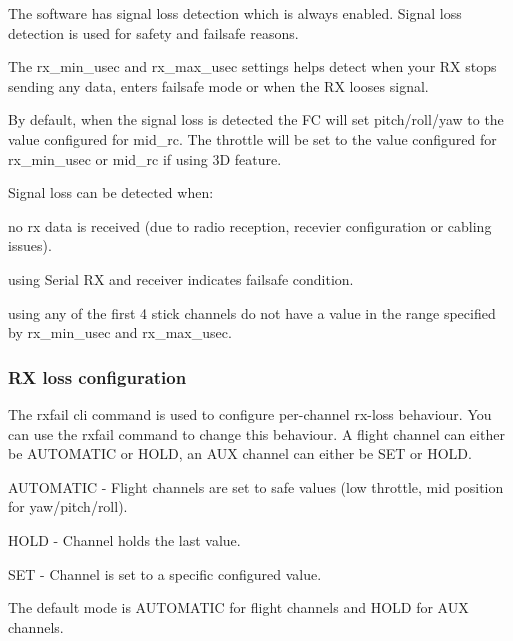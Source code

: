The software has signal loss detection which is always enabled. Signal loss detection is used for safety and failsafe reasons.

The {\ttfamily rx\+\_\+min\+\_\+usec} and {\ttfamily rx\+\_\+max\+\_\+usec} settings helps detect when your R\+X stops sending any data, enters failsafe mode or when the R\+X looses signal.

By default, when the signal loss is detected the F\+C will set pitch/roll/yaw to the value configured for {\ttfamily mid\+\_\+rc}. The throttle will be set to the value configured for {\ttfamily rx\+\_\+min\+\_\+usec} or {\ttfamily mid\+\_\+rc} if using 3\+D feature.

Signal loss can be detected when\+:


\begin{DoxyEnumerate}
\item no rx data is received (due to radio reception, recevier configuration or cabling issues).
\item using Serial R\+X and receiver indicates failsafe condition.
\item using any of the first 4 stick channels do not have a value in the range specified by {\ttfamily rx\+\_\+min\+\_\+usec} and {\ttfamily rx\+\_\+max\+\_\+usec}.
\end{DoxyEnumerate}

\subsubsection*{R\+X loss configuration}

The {\ttfamily rxfail} cli command is used to configure per-\/channel rx-\/loss behaviour. You can use the {\ttfamily rxfail} command to change this behaviour. A flight channel can either be A\+U\+T\+O\+M\+A\+T\+I\+C or H\+O\+L\+D, an A\+U\+X channel can either be S\+E\+T or H\+O\+L\+D.


\begin{DoxyItemize}
\item A\+U\+T\+O\+M\+A\+T\+I\+C -\/ Flight channels are set to safe values (low throttle, mid position for yaw/pitch/roll).
\item H\+O\+L\+D -\/ Channel holds the last value.
\item S\+E\+T -\/ Channel is set to a specific configured value.
\end{DoxyItemize}

The default mode is A\+U\+T\+O\+M\+A\+T\+I\+C for flight channels and H\+O\+L\+D for A\+U\+X channels.

